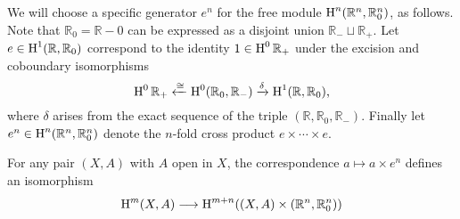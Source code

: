 \documentclass[../main]{subfiles}
\begin{document}
We will choose a specific generator $e^n$ for the free module $\operatorname{H}^n (\mathbb{R}^n, \mathbb{R}_0^n)$, as follows. Note that $\mathbb{R}_0 = \mathbb{R}-0$ can be expressed as a disjoint union $\mathbb{R}_- \sqcup \mathbb{R}_+$. Let $e \in \operatorname{H}^1 (\mathbb{R}, \mathbb{R}_0)$ correspond to the identity $1\in \operatorname{H}^0 \mathbb{R}_+$ under the excision and coboundary isomorphisms \[\operatorname{H}^0 \mathbb{R}_+ \xleftarrow{\cong} \operatorname{H}^0 (\mathbb{R}_0, \mathbb{R}_-)\xrightarrow{\delta}\operatorname{H}^1(\mathbb{R}, \mathbb{R}_0)\text{,}\] where $\delta$ arises from the exact sequence of the triple $(\mathbb{R}, \mathbb{R}_0, \mathbb{R}_-)$. Finally let $e^n \in \operatorname{H}^n (\mathbb{R}^n, \mathbb{R}_0^n)$ denote the $n$-fold cross product $e\times \cdots \times e$.
\begin{theorem}\label{thm:A.5}
For any pair $(X, A)$ with $A$ open in $X$, the correspondence $a \mapsto a \times e^n$ defines an isomorphism \[\homology^m (X, A) \varrightarrow{} \homology^{m+n} ((X, A)\times (\mathbb{R}^n, \mathbb{R}_0^n))\]
\end{theorem}
\end{document}
